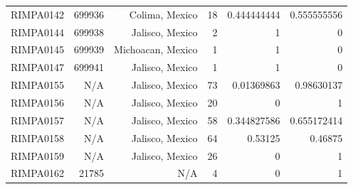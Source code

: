 \documentclass[12pt]{article}
\begin{document}
\begin{table}[htbp]
\begin{tabular}{rrrrrr}
    RIMPA0142 & 699936 & Colima, Mexico & 18    & 0.444444444 & 0.555555556 \\
    RIMPA0144 & 699938 & Jalisco, Mexico & 2     & 1     & 0 \\
    RIMPA0145 & 699939 & Michoacan, Mexico & 1     & 1     & 0 \\
    RIMPA0147 & 699941 & Jalisco, Mexico & 1     & 1     & 0 \\
    RIMPA0155 & N/A   & Jalisco, Mexico & 73    & 0.01369863 & 0.98630137 \\
    RIMPA0156 & N/A   & Jalisco, Mexico & 20    & 0     & 1 \\
    RIMPA0157 & N/A   & Jalisco, Mexico & 58    & 0.344827586 & 0.655172414 \\
    RIMPA0158 & N/A   & Jalisco, Mexico & 64    & 0.53125 & 0.46875 \\
    RIMPA0159 & N/A   & Jalisco, Mexico & 26    & 0     & 1 \\
    RIMPA0162 & 21785 & N/A   & 4     & 0     & 1 \\
    \end{tabular}
  \label{TableS1}
\end{table}
\end{document}
